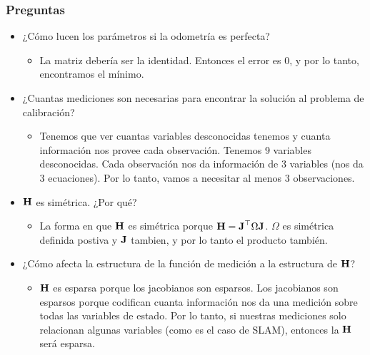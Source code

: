 \begin{frame}
    \frametitle{Preguntas}
    
    \begin{itemize}
        \item<1-> ¿Cómo lucen los parámetros si la odometría es perfecta?
        \begin{itemize}
            \item<2-> La matriz debería ser la identidad. Entonces el error es 0, y por lo tanto, encontramos el mínimo.
        \end{itemize}
        \item<3-> ¿Cuantas mediciones son necesarias para encontrar la solución al problema de calibración?
        \begin{itemize}
            \item<4-> Tenemos que ver cuantas variables desconocidas tenemos y cuanta información nos provee cada observación. Tenemos 9 variables desconocidas. Cada observación nos da información de 3 variables (nos da 3 ecuaciones). Por lo tanto, vamos a necesitar al menos 3 observaciones.
        \end{itemize}
        \item<5-> $\boldsymbol{\mathbf{H}}$ es simétrica. ¿Por qué?
        \begin{itemize}
            \item<6-> La forma en que $\boldsymbol{\mathbf{H}}$ es simétrica porque  $\boldsymbol{\mathbf{H}} = \boldsymbol{\mathbf{J}}^{\top}\Omega\boldsymbol{\mathbf{J}}$. $\Omega$ es simétrica definida postiva y $\boldsymbol{\mathbf{J}}$ tambien, y por lo tanto el producto también.
        \end{itemize}
        \item<7-> ¿Cómo afecta la estructura de la función de medición a la estructura de $\boldsymbol{\mathbf{H}}$?
        \begin{itemize}
            \item<8-> $\boldsymbol{\mathbf{H}}$ es esparsa porque los jacobianos son esparsos. Los jacobianos son esparsos porque codifican cuanta información nos da una medición sobre todas las variables de estado. Por lo tanto, si nuestras mediciones solo relacionan algunas variables (como es el caso de SLAM), entonces la $\boldsymbol{\mathbf{H}}$ será esparsa.
        \end{itemize}
    \end{itemize}

\end{frame}

